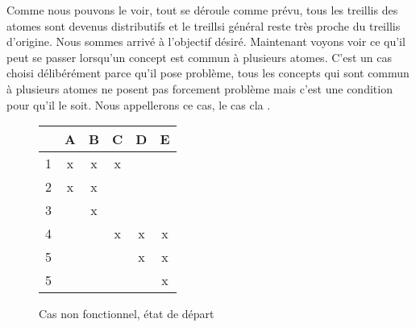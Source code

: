 Comme nous pouvons le voir, tout se déroule comme prévu, tous les treillis des atomes sont devenus distributifs et le treillsi général reste très proche du treillis d'origine. Nous sommes arrivé à l'objectif désiré. Maintenant voyons voir ce qu'il peut se passer lorsqu'un concept est commun à plusieurs atomes. C'est un cas choisi délibérément parce qu'il pose problème, tous les concepts qui sont commun à plusieurs atomes ne posent pas forcement problème mais c'est une condition pour qu'il le soit. Nous appellerons ce cas, le \guillemotleft{} cas cla \guillemotright{}.

\begin{figure}[H]
	\begin{minipage}[c]{0.5\textwidth}
	\begin{center}
		\begin{tabular}{ l | c c c c c }
			 & A & B & C & D & E \\
			\hline
			1 & x & x & x & & \\
			2 & x & x & & & \\
			3 & & x & & & \\
			4 & & & x & x & x \\
			5 & & & & x & x \\
			5 & & & & & x \\
		\end{tabular}
	\end{center}
	\end{minipage}
	\begin{minipage}[c]{0.5\textwidth}
	\begin{center}
	\end{center}
	\end{minipage}
	\caption{Cas non fonctionnel, état de départ}
\end{figure}

